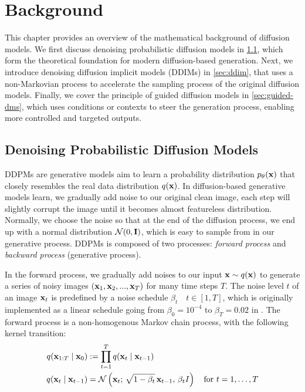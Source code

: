 \chapter{Background}
\label{chap:background}

This chapter provides an overview of the mathematical background of diffusion models. We first discuss denoising probabilistic diffusion models in \cref{sec:ddpm}, which form the theoretical foundation for modern diffusion-based generation. Next, we introduce denoising diffusion implicit models (DDIMs) in \cref{sec:ddim}, that uses a non-Markovian process to accelerate the sampling process of the original diffusion models. Finally, we cover the principle of guided diffusion models in \cref{sec:guided-dms}, which uses conditions or contexts to steer the generation process, enabling more controlled and targeted outputs.

\minitoc

\section{Denoising Probabilistic Diffusion Models}
\label{sec:ddpm}

\newcommand{\ExpMp}[2]{\mathrm{Exp}^{\rmM}_{#1, t}(#2)}
\newcommand{\tangentM}{\rmT_{\rvp}\rmM}

\ac{DDPMs} \cite{hoDDPM} are generative models aim to learn a probability distribution $p_{\theta}({\mathbf{x}})$ that closely resembles the real data distribution $q({\mathbf{x}})$. In diffusion-based generative models learn, we gradually add noise to our original clean image, each step will slightly corrupt the image until it becomes almost featureless distribution. Normally, we choose the noise so that at the end of the diffusion process, we end up with a normal distribution ${\mathcal{N}}(0, {\mathbf{I}})$, which is easy to sample from in our generative process. \ac{DDPMs} is composed of two processes: \textit{forward process} and \textit{backward process} (generative process).

 In the forward process, we gradually add noises to our input ${\mathbf{x}} \sim q({\mathbf{x}})$ to generate a series of noisy images $({\mathbf{x}}_1, {\mathbf{x}}_2, ..., {\mathbf{x}}_T)$ for many time steps $T$. The noise level $t$ of an image ${\mathbf{x}}_t$ is predefined by a noise schedule $\beta_t \quad t \in [1, T]$, which is originally implemented as a linear schedule going from $\beta_0 = 10^{-4}$ to $\beta_T = 0.02$ in \cite{hoDDPM}. The forward process is a non-homogenous Markov chain process, with the following kernel transition: 
\begin{align}
    q({\mathbf{x}}_{1:T} \mid {\mathbf{x}}_0) &:= \prod_{t=1}^{T} q({\mathbf{x}}_t \mid {\mathbf{x}}_{t-1}) \\
    q({\mathbf{x}}_t \mid {\mathbf{x}}_{t-1}) &= {\mathcal{N}}\left({\mathbf{x}}_t;\, \sqrt{1 - \beta_t}\, {\mathbf{x}}_{t-1},\, \beta_t I\right) \label{eq:forward} \quad \text{for } t = 1,\ldots,T
\end{align}

